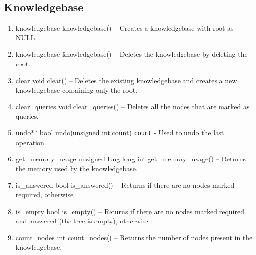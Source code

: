 \subsection{Knowledgebase}
\begin{enumerate}
\item \begin{detail}
{knowledgebase}
{knowledgebase()}
{--}
{Creates a knowledgebase with root as NULL.} 
\end{detail}
\item \begin{detail}
{knowledgebase}
{\~knowledgebase()}
{--}
{Deletes the knowledgebase by deleting the root.} 
\end{detail}
\item \begin{detail}
{clear}
{void clear()}
{--}
{Deletes the existing knowledgebase and creates a new knowledgebase containing only the root.} 
\end{detail}
\item \begin{detail}
{clear\_queries}
{void clear\_queries()}
{--}
{Deletes all the nodes that are marked as queries.} 
\end{detail}
\item \begin{detail}
{undo**}
{bool undo(unsigned int count)}
{\texttt{count} - }
{Used to undo the last operation.} 
\end{detail}
\item \begin{detail}
{get\_memory\_usage}
{unsigned long long int get\_memory\_usage()}
{--}
{Returns the memory used by the knowledgebase.} 
\end{detail}
\item \begin{detail}
{is\_answered}
{bool is\_answered()}
{--}
{Returns \true if there are no nodes marked required, \false otherwise.} 
\end{detail}
\item \begin{detail}
{is\_empty}
{bool is\_empty()}
{--}
{Returns \true if there are no nodes marked required and answered (the tree is empty), \false otherwise.} 
\end{detail}
\item \begin{detail}
{count\_nodes}
{int count\_nodes()}
{--}
{Returns the number of nodes present in the knowledgebase.} 
\end{detail}

\end{enumerate}
